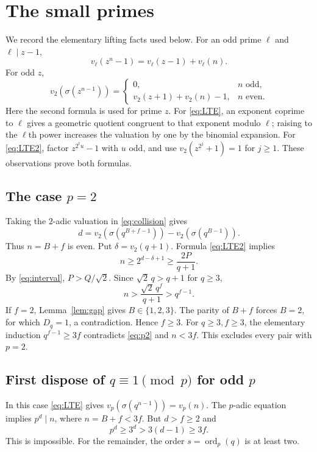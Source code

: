 \documentclass[11pt]{article}
\DeclareMathOperator{\ord}{ord}
\begin{document}
\section{The small primes}
We record the elementary lifting facts used below. For an odd prime $\ell$ and $\ell\mid z-1$,
\begin{equation}\label{eq:LTE}
 v_\ell(z^n-1)=v_\ell(z-1)+v_\ell(n).
\end{equation}
For odd $z$,
\begin{equation}\label{eq:LTE2}
 v_2(\sigma(z^{n-1}))=
 \begin{cases}
 0,&n\text{ odd},\\
 v_2(z+1)+v_2(n)-1,&n\text{ even}.
 \end{cases}
\end{equation}
Here the second formula is used for prime $z$. For \eqref{eq:LTE}, an exponent coprime to $\ell$ gives a geometric quotient congruent to that exponent modulo $\ell$; raising to the $\ell$th power increases the valuation by one by the binomial expansion. For \eqref{eq:LTE2}, factor $z^{2^t u}-1$ with $u$ odd, and use $v_2(z^{2^j}+1)=1$ for $j\ge1$. These observations prove both formulas.

\subsection*{The case $p=2$}
Taking the $2$-adic valuation in \eqref{eq:collision} gives
\[
 d=v_2(\sigma(q^{B+f-1}))-v_2(\sigma(q^{B-1})).
\]
Thus $n=B+f$ is even. Put $\delta=v_2(q+1)$. Formula \eqref{eq:LTE2} implies
\[
 n\ge2^{d-\delta+1}\ge\frac{2P}{q+1}.
\]
By \eqref{eq:interval}, $P>Q/\sqrt2$. Since $\sqrt2\,q>q+1$ for $q\ge3$,
\begin{equation}\label{eq:p2}
 n>\frac{\sqrt2\,q^f}{q+1}>q^{f-1}.
\end{equation}
If $f=2$, Lemma~\ref{lem:gap} gives $B\in\{1,2,3\}$. The parity of $B+f$ forces $B=2$, for which $D_q=1$, a contradiction. Hence $f\ge3$. For $q\ge3,f\ge3$, the elementary induction $q^{f-1}\ge3f$ contradicts \eqref{eq:p2} and $n<3f$. This excludes every pair with $p=2$.

\subsection*{First dispose of $q\equiv1\pmod p$ for odd $p$}
In this case \eqref{eq:LTE} gives $v_p(\sigma(q^{n-1}))=v_p(n)$. The $p$-adic equation implies $p^d\mid n$, where $n=B+f<3f$. But $d>f\ge2$ and
\[
 p^d\ge3^d>3(d-1)\ge3f.
\]
This is impossible. For the remainder, the order $s=\ord_p(q)$ is at least two.
\end{document}
